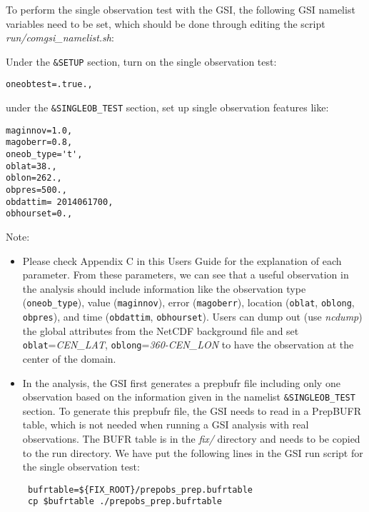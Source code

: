 To perform the single observation test with the GSI, the following GSI namelist variables need to be set, which should be done through editing the script \textit{run/comgsi\_namelist.sh}: 

Under the \verb|&SETUP| section, turn on the single observation test:

\begin{scriptsize}
\begin{verbatim}
oneobtest=.true.,
\end{verbatim}
\end{scriptsize}

under the \verb|&SINGLEOB_TEST| section, set up single observation features like:

\begin{scriptsize}
\begin{verbatim}
maginnov=1.0,
magoberr=0.8,
oneob_type='t',
oblat=38.,
oblon=262.,
obpres=500.,
obdattim= 2014061700,
obhourset=0.,
\end{verbatim}
\end{scriptsize}

Note:

\begin{itemize}
\item Please check Appendix C in this User\textquotesingle s Guide for the explanation of each parameter. From these parameters, we can see that a useful observation in the analysis should include information like the observation type (\verb|oneob_type|), value (\verb|maginnov|), error (\verb|magoberr|), location (\verb|oblat|, \verb|oblong|, \verb|obpres|), and time (\verb|obdattim|, \verb|obhourset|). Users can dump out (use \textit{ncdump}) the global attributes from the NetCDF background file and set \verb|oblat|=\textit{CEN\_LAT}, \verb|oblong|=\textit{360-CEN\_LON} to have the observation at the center of the domain.
\item In the analysis, the GSI first generates a prepbufr file including only one observation based on the information given in the namelist \verb|&SINGLEOB_TEST| section. To generate this prepbufr file, the GSI needs to read in a PrepBUFR table, which is not needed when running a GSI analysis with real observations. The BUFR table is in the \textit{fix/} directory and needs to be copied to the run directory. We have put the following lines in the GSI run script for the single observation test:
\begin{scriptsize}
\begin{verbatim}
 bufrtable=${FIX_ROOT}/prepobs_prep.bufrtable
 cp $bufrtable ./prepobs_prep.bufrtable
\end{verbatim}
\end{scriptsize}
\end{itemize}


